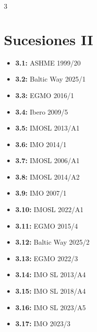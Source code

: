 \documentclass[11pt]{scrartcl}
\begin{document}
\begin{multicols}{3}
\section{Sucesiones II}
\begin{itemize}
    \item \textbf{3.1: } ASHME 1999/20
    \item \textbf{3.2: } Baltic Way 2025/1
    \item \textbf{3.3: } EGMO 2016/1
    \item \textbf{3.4: } Ibero 2009/5
    \item \textbf{3.5: } IMOSL 2013/A1 
    \item \textbf{3.6: } IMO 2014/1
    \item \textbf{3.7: } IMOSL 2006/A1 
    \item \textbf{3.8: } IMOSL 2014/A2 
    \item \textbf{3.9: } IMO 2007/1
    \item \textbf{3.10: } IMOSL 2022/A1 
    \item \textbf{3.11: } EGMO 2015/4
    \item \textbf{3.12: } Baltic Way 2025/2
    \item \textbf{3.13: } EGMO 2022/3
    \item \textbf{3.14: } IMO SL 2013/A4 
    \item \textbf{3.15: } IMO SL 2018/A4 
    \item \textbf{3.16: } IMO SL 2023/A5 
    \item \textbf{3.17: } IMO 2023/3
\end{itemize}
\end{multicols}
\end{document}
